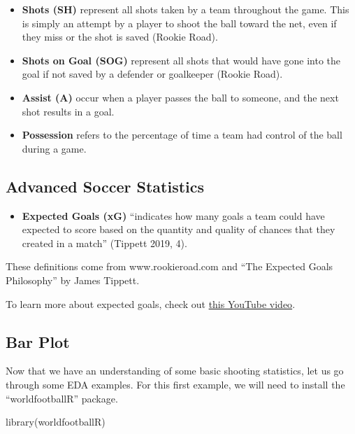 \documentclass[
  11pt,
]{book}
\newenvironment{Shaded}{\begin{snugshade}}{\end{snugshade}}
\newcommand{\FunctionTok}[1]{\textcolor[rgb]{0.00,0.00,0.00}{#1}}
\newcommand{\NormalTok}[1]{#1}
\providecommand{\tightlist}{%
  \setlength{\itemsep}{0pt}\setlength{\parskip}{0pt}}
\theoremstyle{definition}
\theoremstyle{definition}
\theoremstyle{definition}
\theoremstyle{definition}
\theoremstyle{remark}
\begin{document}
\begin{itemize}
\item
  \textbf{Shots (SH)} represent all shots taken by a team throughout the game. This is simply an attempt by a player to shoot the ball toward the net, even if they miss or the shot is saved (Rookie Road).
\item
  \textbf{Shots on Goal (SOG)} represent all shots that would have gone into the goal if not saved by a defender or goalkeeper (Rookie Road).
\item
  \textbf{Assist (A)} occur when a player passes the ball to someone, and the next shot results in a goal.
\item
  \textbf{Possession} refers to the percentage of time a team had control of the ball during a game.
\end{itemize}

\hypertarget{advanced-soccer-statistics}{%
\subsection{Advanced Soccer Statistics}\label{advanced-soccer-statistics}}

\begin{itemize}
\tightlist
\item
  \textbf{Expected Goals (xG)} ``indicates how many goals a team could have expected to score based on the quantity and quality of chances that they created in a match'' (Tippett 2019, 4).
\end{itemize}

These definitions come from www.rookieroad.com and ``The Expected Goals Philosophy'' by James Tippett.

To learn more about expected goals, check out \href{https://www.youtube.com/watch?v=w7zPZsLGK18\&list=PL9Az6mi38hv__afKnHR1AKjpcDIw_0qqT}{this YouTube video}.

\hypertarget{bar-plot}{%
\subsection{Bar Plot}\label{bar-plot}}

Now that we have an understanding of some basic shooting statistics, let us go through some EDA examples. For this first example, we will need to install the ``worldfootballR'' package.

\begin{Shaded}
\begin{Highlighting}[]
\FunctionTok{library}\NormalTok{(worldfootballR)}
\end{Highlighting}
\end{Shaded}
\end{document}
